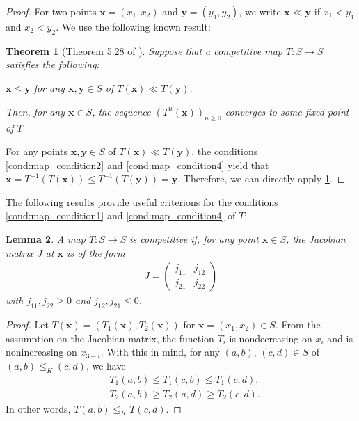 \documentclass[letterpaper,11pt]{article}
\newtheorem{theorem}{Theorem}[section]
\newtheorem{lemma}[theorem]{Lemma}
\begin{document}
\begin{proof}
For two points $\mathbf{x}=(x_1,x_2)$ and $\mathbf{y}=(y_1,y_2)$, we write $\mathbf{x}\ll \mathbf{y}$ if $x_1<y_1$ and $x_2<y_2$.
We use the following known result:
\begin{theorem}[Theorem 5.28 of \cite{HS05}] \label{thm:competitive_map_known_result}
Suppose that a competitive map $T:S\to S$ satisfies the following:
\begin{center}
$\mathbf{x}\leq \mathbf{y}$ for any $\mathbf{x},\mathbf{y}\in S$ of $T(\mathbf{x}) \ll T(\mathbf{y})$.
\end{center}
Then,  for any $\mathbf{x}\in S$, the sequence $(T^n(\mathbf{x}))_{n\geq 0}$ converges to some fixed point of $T$
\end{theorem}

For any points $\mathbf{x},\mathbf{y}\in S$ of $T(\mathbf{x}) \ll T(\mathbf{y})$, the conditions \ref{cond:map_condition2} and \ref{cond:map_condition4} yield that $\mathbf{x}=T^{-1}(T(\mathbf{x})) \leq T^{-1}(T(\mathbf{y})) = \mathbf{y}$.
Therefore, we can directly apply \cref{thm:competitive_map_known_result}.
\end{proof}

The following results provide useful criterions for the conditions \ref{cond:map_condition1} and \ref{cond:map_condition4} of $T$:
\begin{lemma} \label{lem:criterion_C1}
A map $T:S\to S$ is competitive if, for any point $\mathbf{x}\in S$, the Jacobian matrix $J$ at $\mathbf{x}$ is of the form
\begin{align*}
J=\left(\begin{array}{cc}
j_{11} & j_{12} \\
j_{21} & j_{22}
\end{array} \right)
\end{align*}
with $j_{11},j_{22}\geq 0$ and $j_{12},j_{21}\leq 0$.
\end{lemma}
\begin{proof}
Let $T(\mathbf{x})=(T_1(\mathbf{x}),T_2(\mathbf{x}))$ for $\mathbf{x}=(x_1,x_2)\in S$.
From the assumption on the Jacobian matrix, the function $T_i$ is nondecreasing on $x_i$ and is nonincreasing on $x_{3-i}$.
With this in mind, for any $(a,b),\,(c,d)\in S$ of $(a,b)\leq_K (c,d)$, we have
\begin{align*}
&T_1(a,b) \leq T_1(c,b) \leq T_1(c,d),\\
&T_2(a,b) \geq T_2(a,d) \geq T_2(c,d).
\end{align*}
In other words, $T(a,b)\leq_K T(c,d)$.
\end{proof}
\end{document}
